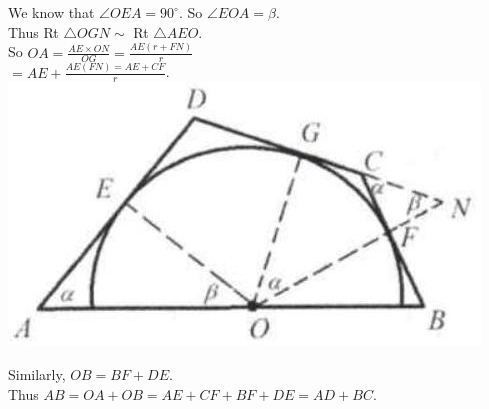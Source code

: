 \documentclass{article}
\begin{document}
We know that \(\angle O E A=90^{\circ}\). So \(\angle E O A=\beta\).\\
Thus Rt \(\triangle O G N \sim\) Rt \(\triangle A E O\).\\
So \(O A=\frac{A E \times O N}{O G}=\frac{A E(r+F N)}{r}\)\\
\(=A E+\frac{A E(F N)=A E+C F}{r}\).\\
\centering
\includegraphics[width=\textwidth]{images/149(1).jpg}

Similarly, \(O B=B F+D E\).\\
Thus \(A B=O A+O B=A E+C F+B F+D E=A D+B C\).
\end{document}
